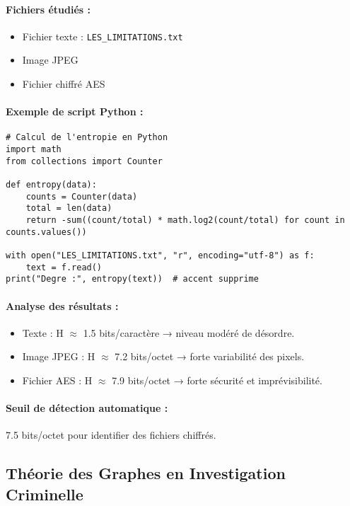 \documentclass[12pt,a4paper]{article}
\begin{document}
\paragraph{Fichiers \'etudi\'es :}
\begin{itemize}
    \item Fichier texte : \texttt{LES_LIMITATIONS.txt}
    \item Image JPEG
    \item Fichier chiffr\'e AES
\end{itemize}

\paragraph{Exemple de script Python :}
\begin{lstlisting}
# Calcul de l'entropie en Python
import math
from collections import Counter

def entropy(data):
    counts = Counter(data)
    total = len(data)
    return -sum((count/total) * math.log2(count/total) for count in counts.values())

with open("LES_LIMITATIONS.txt", "r", encoding="utf-8") as f:
    text = f.read()
print("Degre :", entropy(text))  # accent supprime
\end{lstlisting}

\paragraph{Analyse des r\'esultats :}  
\begin{itemize}
    \item Texte : H $\approx$ 1.5 bits/caract\`ere → niveau mod\'er\'e de d\'esordre.  
    \item Image JPEG : H $\approx$ 7.2 bits/octet → forte variabilit\'e des pixels.  
    \item Fichier AES : H $\approx$ 7.9 bits/octet → forte s\'ecurit\'e et impr\'evisibilit\'e.  
\end{itemize}

\paragraph{Seuil de d\'etection automatique :} 7.5 bits/octet pour identifier des fichiers chiffr\'es.

\subsection*{Th\'eorie des Graphes en Investigation Criminelle}
\end{document}
